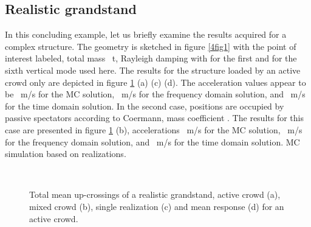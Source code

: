 \documentclass[preprint,12pt,authoryear]{elsarticle}
\begin{document}
\subsection{Realistic grandstand}
\label{grandstand}
In this concluding example, let us briefly examine the results acquired for a complex structure. The geometry is sketched in figure \ref{4fig1} with the point of interest labeled, total mass ~t, Rayleigh damping with  for the first and  for the sixth vertical mode used here. The results for the structure loaded by an active crowd only are depicted in figure \ref{4fig6} (a) (c) (d). The acceleration  values appear to be ~m/s for the MC solution, ~m/s for the frequency domain solution, and ~m/s for the time domain solution. In the second case,  positions are occupied by passive spectators according to Coermann, mass coefficient . The results for this case are presented in figure \ref{4fig6} (b),  accelerations ~m/s for the MC solution, ~m/s for the frequency domain solution, and ~m/s for the time domain solution. MC simulation based on  realizations.
\begin{figure}
	\centering
{}
\\
	\caption{Total mean up-crossings of a realistic grandstand, active crowd (a), mixed crowd (b), single realization (c) and mean response (d) for an active crowd.}
	\label{4fig6}
\end{figure}
\end{document}
